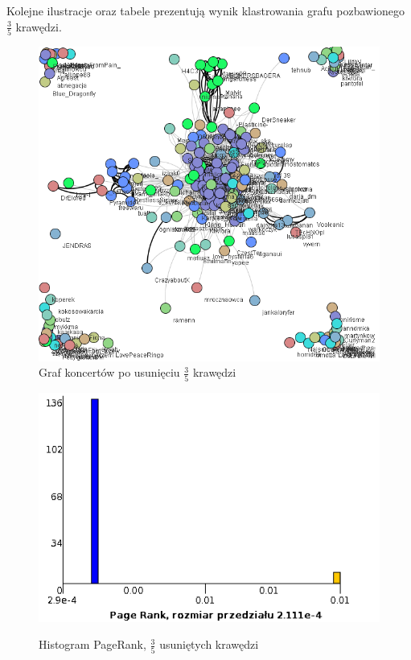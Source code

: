 \documentclass[10pt,a4paper]{article}
\begin{document}
  Kolejne ilustracje oraz tabele prezentują wynik klastrowania grafu pozbawionego  $\frac{3}{5}$  krawędzi.
\begin{figure}[H]
\centering
\caption{Graf koncertów po usunięciu $\frac{3}{5}$ krawędzi}
\includegraphics[scale=0.5]{wyniki/final200Events/3200events.png}
\end{figure}

\begin{figure}[H]
\centering
\caption{Histogram PageRank, $\frac{3}{5}$ usuniętych krawędzi}
\includegraphics[scale=0.6]{wyniki/final200Events/3200eventsPRHist.png}
\label{fig:1200lovedPRHist}
\end{figure}
\end{document}
